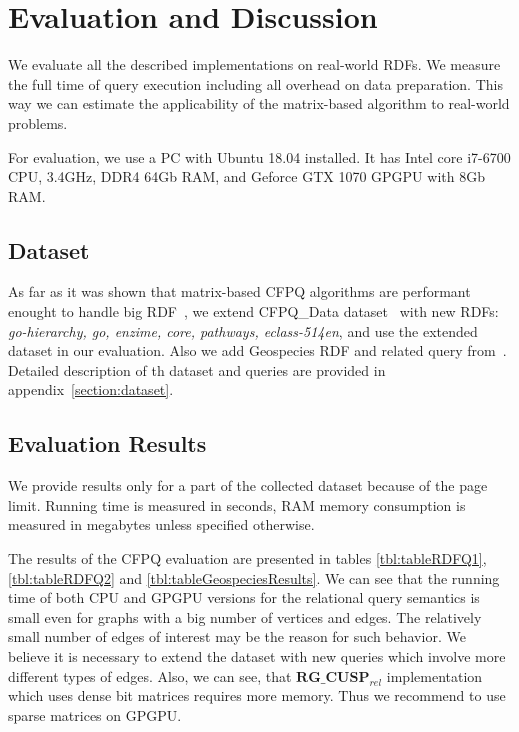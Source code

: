 \section{Evaluation and Discussion}

We evaluate all the described implementations on real-world RDFs.
We measure the full time of query execution including all overhead on data preparation.
This way we can estimate the applicability of the matrix-based algorithm to real-world problems.

For evaluation, we use a PC with Ubuntu 18.04 installed.
It has Intel core i7-6700 CPU, 3.4GHz, DDR4 64Gb RAM, and Geforce GTX 1070 GPGPU with 8Gb RAM.

\subsection{Dataset}
As far as it was shown that matrix-based CFPQ algorithms are performant enought to handle big RDF~\cite{Mishin:2019:ECP:3327964.3328503}, we extend CFPQ\_Data dataset~\cite{Mishin:2019:ECP:3327964.3328503} with new RDFs: \textit{go-hierarchy, go, enzime, core, pathways, eclass-514en}, and use the extended dataset in our evaluation. Also we add Geospecies RDF and related query from~\cite{Kuijpers:2019:ESC:3335783.3335791}. 
Detailed description of th dataset and queries are provided in appendix~\ref{section:dataset}.


\subsection{Evaluation Results}
We provide results only for a part of the collected dataset because of the page limit.
Running time is measured in seconds, RAM memory consumption is measured in megabytes unless specified otherwise.

The results of the CFPQ evaluation are presented in tables \ref{tbl:tableRDFQ1}, \ref{tbl:tableRDFQ2} and \ref{tbl:tableGeospeciesResults}.
We can see that the running time of both CPU and GPGPU versions for the relational query semantics is small even for graphs with a big number of vertices and edges.
The relatively small number of edges of interest may be the reason for such behavior.
We believe it is necessary to extend the dataset with new queries which involve more different types of edges.
Also, we can see, that $\textbf{RG\_CUSP}_{\textit{rel}}$ implementation which uses dense bit matrices requires more memory.
Thus we recommend to use sparse matrices on GPGPU.

